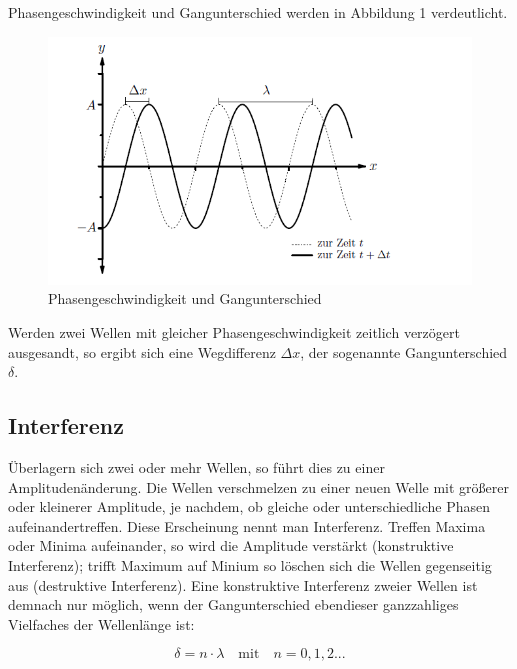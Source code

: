 \documentclass[12pt,a4paper,titlepage,headinclude,bibtotoc]{scrartcl}
\begin{document}
Phasengeschwindigkeit und Gangunterschied werden in Abbildung 1 verdeutlicht.

\begin{figure} [h]
\begin{center}
\includegraphics[scale=0.75]{Phasengeschwindigkeit2.png} \end{center}
\caption{Phasengeschwindigkeit und Gangunterschied}
\end{figure}

Werden zwei Wellen mit gleicher Phasengeschwindigkeit zeitlich verzögert ausgesandt, so ergibt sich eine Wegdifferenz $\Delta x$, der sogenannte Gangunterschied $\delta$. 

\subsection{Interferenz}
Überlagern sich zwei oder mehr Wellen, so führt dies zu einer Amplitudenänderung. Die Wellen verschmelzen zu einer neuen Welle mit größerer oder kleinerer Amplitude, je nachdem, ob gleiche oder unterschiedliche Phasen aufeinandertreffen. Diese Erscheinung nennt man Interferenz. Treffen Maxima oder Minima aufeinander, so wird die Amplitude verstärkt (konstruktive Interferenz); trifft Maximum auf Minium so löschen sich die Wellen gegenseitig aus (destruktive Interferenz). 
Eine konstruktive Interferenz zweier Wellen ist demnach nur möglich, wenn der Gangunterschied ebendieser ganzzahliges Vielfaches der Wellenlänge ist:\\
\par
\begin{equation}
\delta={n}\cdot {\lambda} \quad \mathrm{mit}\quad n = 0,1,2...
\end{equation}
\\
\par
\end{document}
